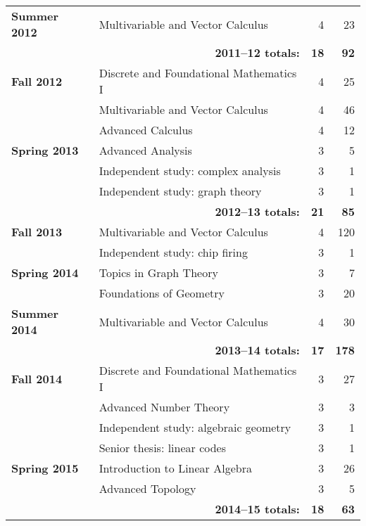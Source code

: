 \documentclass[12pt]{article}
\begin{document}
\begin{center}
\begin{longtable}{@{} l @{\hspace{1ex}} l @{} rr @{}}
\textbf{Summer 2012} & Multivariable and Vector Calculus & 4 & 23 \\
 \cmidrule{2-4}
 & \multicolumn{1}{r}{\textbf{2011--12 totals:}} & \textbf{18} & \textbf{92} \\
 \cmidrule{2-4}

\textbf{Fall 2012} & Discrete and Foundational Mathematics I & 4 & 25 \\
 & Multivariable and Vector Calculus & 4 & 46 \\
 & Advanced Calculus & 4 & 12 \\
\addlinespace[0.1in]

\textbf{Spring 2013} & Advanced Analysis & 3 & 5 \\
 & Independent study: complex analysis & 3 & 1 \\
 & Independent study: graph theory & 3 & 1 \\
 \cmidrule{2-4}
 & \multicolumn{1}{r}{\textbf{2012--13 totals:}} & \textbf{21} & \textbf{85} \\
 \cmidrule{2-4}

\textbf{Fall 2013} & Multivariable and Vector Calculus & 4 & 120 \\
  & Independent study: chip firing & 3 & 1 \\
\addlinespace[0.1in]

\textbf{Spring 2014} & Topics in Graph Theory & 3 & 7 \\
 & Foundations of Geometry & 3 & 20 \\
\addlinespace[0.1in]

\textbf{Summer 2014} & Multivariable and Vector Calculus & 4 & 30 \\
 \cmidrule{2-4}
 & \multicolumn{1}{r}{\textbf{2013--14 totals:}} & \textbf{17} & \textbf{178} \\
 \cmidrule{2-4}

\textbf{Fall 2014} & Discrete and Foundational Mathematics I & 3 & 27 \\
 & Advanced Number Theory & 3 & 3 \\
 & Independent study: algebraic geometry & 3 & 1 \\
 & Senior thesis: linear codes & 3 & 1 \\
\addlinespace[0.1in]

\textbf{Spring 2015} & Introduction to Linear Algebra & 3 & 26 \\
 & Advanced Topology & 3 & 5 \\
 \cmidrule{2-4}
 & \multicolumn{1}{r}{\textbf{2014--15 totals:}} & \textbf{18} & \textbf{63} \\
 \cmidrule{2-4}


\end{longtable}
\end{center}
\end{document}
